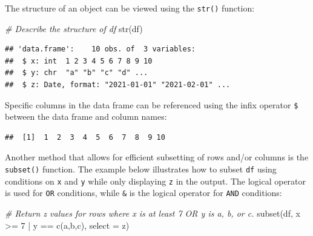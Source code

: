 \documentclass[
]{book}
\newenvironment{Shaded}{\begin{snugshade}}{\end{snugshade}}
\newcommand{\AttributeTok}[1]{\textcolor[rgb]{0.77,0.63,0.00}{#1}}
\newcommand{\CommentTok}[1]{\textcolor[rgb]{0.56,0.35,0.01}{\textit{#1}}}
\newcommand{\DecValTok}[1]{\textcolor[rgb]{0.00,0.00,0.81}{#1}}
\newcommand{\FunctionTok}[1]{\textcolor[rgb]{0.00,0.00,0.00}{#1}}
\newcommand{\NormalTok}[1]{#1}
\newcommand{\SpecialCharTok}[1]{\textcolor[rgb]{0.00,0.00,0.00}{#1}}
\newcommand{\StringTok}[1]{\textcolor[rgb]{0.31,0.60,0.02}{#1}}
\begin{document}
The structure of an object can be viewed using the \texttt{str()} function:

\begin{Shaded}
\begin{Highlighting}[]
\CommentTok{\# Describe the structure of df}
\FunctionTok{str}\NormalTok{(df)}
\end{Highlighting}
\end{Shaded}

\begin{verbatim}
## 'data.frame':    10 obs. of  3 variables:
##  $ x: int  1 2 3 4 5 6 7 8 9 10
##  $ y: chr  "a" "b" "c" "d" ...
##  $ z: Date, format: "2021-01-01" "2021-02-01" ...
\end{verbatim}

Specific columns in the data frame can be referenced using the infix operator \texttt{\$} between the data frame and column names:

\begin{Shaded}
\end{Shaded}

\begin{verbatim}
##  [1]  1  2  3  4  5  6  7  8  9 10
\end{verbatim}

Another method that allows for efficient subsetting of rows and/or columns is the \texttt{subset()} function. The example below illustrates how to subset \texttt{df} using conditions on \texttt{x} and \texttt{y} while only displaying \texttt{z} in the output. The logical operator \texttt{\textbar{}} is used for \texttt{OR} conditions, while \texttt{\&} is the logical operator for \texttt{AND} conditions:

\begin{Shaded}
\begin{Highlighting}[]
\CommentTok{\# Return z values for rows where x is at least 7 OR y is a, b, or c.}
\FunctionTok{subset}\NormalTok{(df, x }\SpecialCharTok{\textgreater{}=} \DecValTok{7} \SpecialCharTok{|}\NormalTok{ y }\SpecialCharTok{==} \FunctionTok{c}\NormalTok{(}\StringTok{\textquotesingle{}a\textquotesingle{}}\NormalTok{,}\StringTok{\textquotesingle{}b\textquotesingle{}}\NormalTok{,}\StringTok{\textquotesingle{}c\textquotesingle{}}\NormalTok{), }\AttributeTok{select =}\NormalTok{ z)}
\end{Highlighting}
\end{Shaded}
\end{document}
